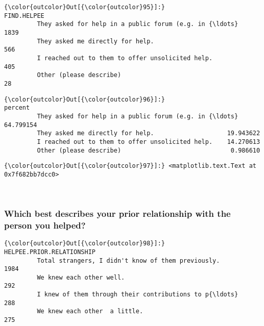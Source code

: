 \documentclass[11pt]{article}
\begin{document}
            \begin{Verbatim}[commandchars=\\\{\}]
{\color{outcolor}Out[{\color{outcolor}95}]:}                                                     FIND.HELPEE
         They asked for help in a public forum (e.g. in {\ldots}         1839
         They asked me directly for help.                            566
         I reached out to them to offer unsolicited help.            405
         Other (please describe)                                      28
\end{Verbatim}
        

            \begin{Verbatim}[commandchars=\\\{\}]
{\color{outcolor}Out[{\color{outcolor}96}]:}                                                       percent
         They asked for help in a public forum (e.g. in {\ldots}  64.799154
         They asked me directly for help.                    19.943622
         I reached out to them to offer unsolicited help.    14.270613
         Other (please describe)                              0.986610
\end{Verbatim}
        

            \begin{Verbatim}[commandchars=\\\{\}]
{\color{outcolor}Out[{\color{outcolor}97}]:} <matplotlib.text.Text at 0x7f682bb7dcc0>
\end{Verbatim}
        
    \begin{center}
    \end{center}
    { \hspace*{\fill} \\}
    
    \subsubsection{Which best describes your prior relationship with the
person you
helped?}\label{which-best-describes-your-prior-relationship-with-the-person-you-helped}


            \begin{Verbatim}[commandchars=\\\{\}]
{\color{outcolor}Out[{\color{outcolor}98}]:}                                                     HELPEE.PRIOR.RELATIONSHIP
         Total strangers, I didn't know of them previously.                       1984
         We knew each other well.                                                  292
         I knew of them through their contributions to p{\ldots}                        288
         We knew each other  a little.                                             275
\end{Verbatim}
        
\end{document}
